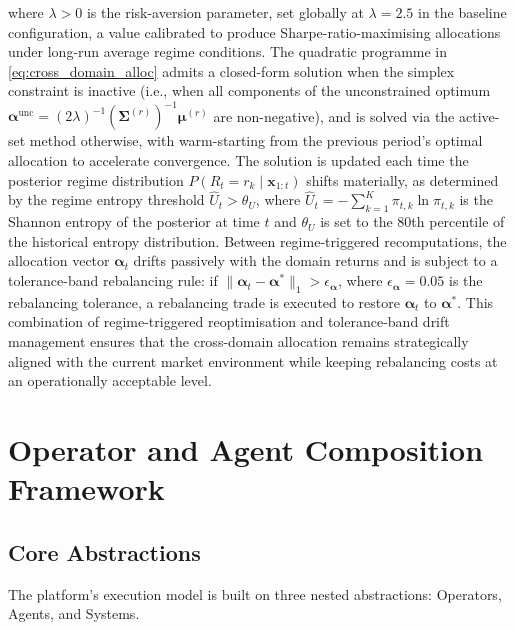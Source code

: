 \documentclass[12pt,openany]{book}
\numberwithin{equation}{chapter}
\theoremstyle{plain}
\theoremstyle{definition}
\theoremstyle{remark}
\begin{document}
where $\lambda > 0$ is the risk-aversion parameter, set globally at $\lambda = 2.5$ in the baseline configuration, a value calibrated to produce Sharpe-ratio-maximising allocations under long-run average regime conditions. The quadratic programme in \eqref{eq:cross_domain_alloc} admits a closed-form solution when the simplex constraint is inactive (i.e., when all components of the unconstrained optimum $\boldsymbol{\alpha}^{\mathrm{unc}} = (2\lambda)^{-1}(\boldsymbol{\Sigma}^{(r)})^{-1}\boldsymbol{\mu}^{(r)}$ are non-negative), and is solved via the active-set method otherwise, with warm-starting from the previous period's optimal allocation to accelerate convergence. The solution is updated each time the posterior regime distribution $P(R_t = r_k \mid \mathbf{x}_{1:t})$ shifts materially, as determined by the regime entropy threshold $\hat{U}_t > \theta_U$, where $\hat{U}_t = -\sum_{k=1}^K \pi_{t,k} \ln \pi_{t,k}$ is the Shannon entropy of the posterior at time $t$ and $\theta_U$ is set to the 80th percentile of the historical entropy distribution. Between regime-triggered recomputations, the allocation vector $\boldsymbol{\alpha}_t$ drifts passively with the domain returns and is subject to a tolerance-band rebalancing rule: if $\|\boldsymbol{\alpha}_t - \boldsymbol{\alpha}^*\|_1 > \epsilon_{\boldsymbol{\alpha}}$, where $\epsilon_{\boldsymbol{\alpha}} = 0.05$ is the rebalancing tolerance, a rebalancing trade is executed to restore $\boldsymbol{\alpha}_t$ to $\boldsymbol{\alpha}^*$. This combination of regime-triggered reoptimisation and tolerance-band drift management ensures that the cross-domain allocation remains strategically aligned with the current market environment while keeping rebalancing costs at an operationally acceptable level.

\chapter{Operator and Agent Composition Framework}

\section{Core Abstractions}

The platform's execution model is built on three nested abstractions:
Operators, Agents, and Systems.
\end{document}
